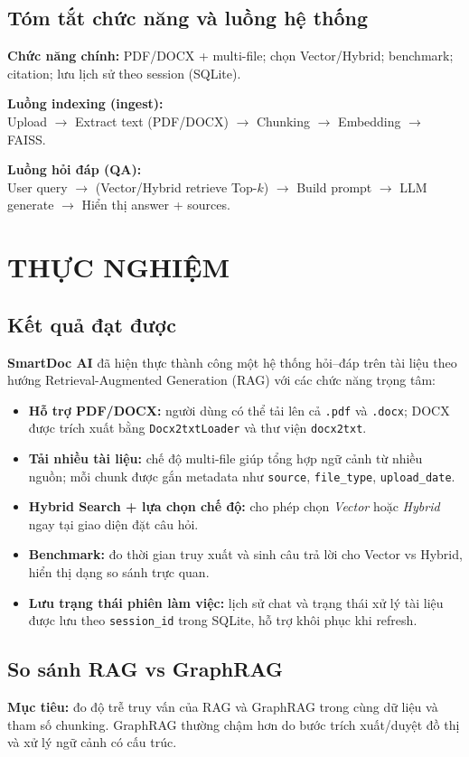 \documentclass[10pt, conference, a4paper, compsocconf]{IEEEtran}
\begin{document}
\subsection{Tóm tắt chức năng và luồng hệ thống}
\textbf{Chức năng chính:} PDF/DOCX + multi-file; chọn Vector/Hybrid; benchmark; citation; lưu lịch sử theo session (SQLite).

\textbf{Luồng indexing (ingest):}\\
Upload $\rightarrow$ Extract text (PDF/DOCX) $\rightarrow$ Chunking $\rightarrow$ Embedding $\rightarrow$ FAISS.

\textbf{Luồng hỏi đáp (QA):}\\
User query $\rightarrow$ (Vector/Hybrid retrieve Top-$k$) $\rightarrow$ Build prompt $\rightarrow$ LLM generate $\rightarrow$ Hiển thị answer + sources.

\section{THỰC NGHIỆM}
\subsection{Kết quả đạt được}
\textbf{SmartDoc AI} đã hiện thực thành công một hệ thống hỏi--đáp trên tài liệu theo hướng Retrieval-Augmented Generation (RAG) với các chức năng trọng tâm:
\begin{itemize}
  \item \textbf{Hỗ trợ PDF/DOCX:} người dùng có thể tải lên cả \texttt{.pdf} và \texttt{.docx}; DOCX được trích xuất bằng \texttt{Docx2txtLoader} và thư viện \texttt{docx2txt}.
  \item \textbf{Tải nhiều tài liệu:} chế độ multi-file giúp tổng hợp ngữ cảnh từ nhiều nguồn; mỗi chunk được gắn metadata như \texttt{source}, \texttt{file\_type}, \texttt{upload\_date}.
  \item \textbf{Hybrid Search + lựa chọn chế độ:} cho phép chọn \textit{Vector} hoặc \textit{Hybrid} ngay tại giao diện đặt câu hỏi.
  \item \textbf{Benchmark:} đo thời gian truy xuất và sinh câu trả lời cho Vector vs Hybrid, hiển thị dạng so sánh trực quan.
  \item \textbf{Lưu trạng thái phiên làm việc:} lịch sử chat và trạng thái xử lý tài liệu được lưu theo \texttt{session\_id} trong SQLite, hỗ trợ khôi phục khi refresh.
\end{itemize}

\subsection{So sánh RAG vs GraphRAG}
\textbf{Mục tiêu:} đo độ trễ truy vấn của RAG và GraphRAG trong cùng dữ liệu và tham số chunking. GraphRAG thường chậm hơn do bước trích xuất/duyệt đồ thị và xử lý ngữ cảnh có cấu trúc.
\end{document}
